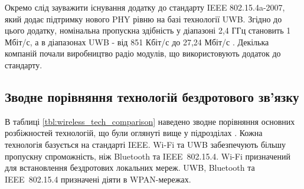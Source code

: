 \documentclass[a4paper,ukrainian,utf8,nocolumnsxix,floatsection,equationsection]{eskdtext}
\newcommand{\todoi}[1]{\todo[inline]{#1}}
\newcommand{\iee}[0]{IEEE~802.15.4\xspace}
\begin{document}
Окремо слід зауважити існування додатку до стандарту IEEE 802.15.4a-2007, який додає підтримку нового PHY рівню на базі технології UWB. Згідно до цього додатку, номінальна пропускна здібність у діапазоні 2,4 ГГц становить 1 Мбіт/с, а в діапазонах UWB - від 851 Кбіт/с до 27,24 Мбіт/с \cite{802154a:overview}. Декілька компаній почали виробництво радіо модулів, що використовують додаток до стандарту.




\subsection{Зводне порівняння технологій бездротового зв’язку}

В таблиці \ref{tbl:wireless_tech_comparison} наведено зводне порівняння основних розбіжностей технологій, що були оглянуті вище у підрозділах . Кожна технологія базується на стандарті IEEE. Wi-Fi та UWB забезпечують більшу пропускну спроможність, ніж Bluetooth та \iee. Wi-Fi призначений для встановлення бездротових локальних мереж. UWB, Bluetooth та \iee призначені діяти в WPAN-мережах.
\end{document}
